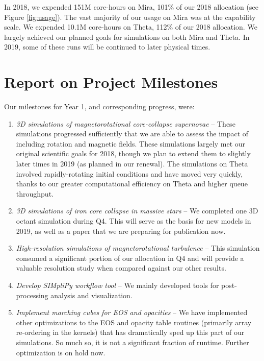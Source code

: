 \documentclass[12pt,titlepage]{article}
\begin{document}
In 2018, we expended 151M core-hours on Mira, 101\% of our 2018 allocation (see Figure \ref{fig:usage}).
The vast majority of our usage on Mira was at the capability scale.
We expended 10.1M core-hours on Theta, 112\% of our 2018 allocation. 
We largely achieved our planned goals for simulations on both Mira and Theta. 
In 2019, some of these runs will be continued to later physical times.


\section{Report on Project Milestones}

Our milestones for Year 1, and corresponding progress, were:
\begin{enumerate}
  \item {\it 3D simulations of magnetorotational core-collapse supernovae} -- These simulations  progressed sufficiently that we are able to assess the impact of including rotation and magnetic fields. These simulations largely met our original scientific goals for 2018, though we plan to extend them to slightly later times in 2019 (as planned in our renewal). The simulations on Theta involved rapidly-rotating initial conditions and have moved very quickly, thanks to our greater computational efficiency on Theta and higher queue throughput.
  \item {\it 3D simulations of iron core collapse in massive stars} -- We completed one 3D octant simulation during Q4. This will serve as the basis for new models in 2019, as well as a paper that we are preparing for publication now.
  \item {\it High-resolution simulations of magnetorotational turbulence} -- This simulation consumed a significant portion of our allocation in Q4 and will provide a valuable resolution study when compared against our other results.
  \item {\it Develop SIMpliPy workflow tool} -- We mainly developed tools for post-processing analysis and visualization. 
  \item {\it Implement marching cubes for EOS and opacities} -- We have implemented other optimizations to the EOS and opacity table routines (primarily array re-ordering in the kernels) that has dramatically sped up this part of our simulations. So much so, it is not a significant fraction of runtime. Further optimization is on hold now.
\end{enumerate}
\end{document}
